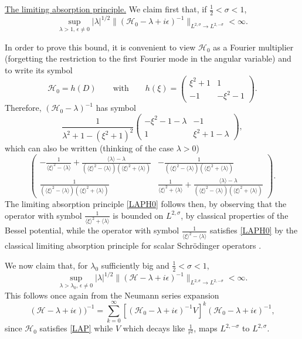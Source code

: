 \documentclass[11 pt]{amsart}
\theoremstyle{definition}
\theoremstyle{remark}
\numberwithin{equation}{section}
\begin{document}
\medskip
\noindent
\underline{The limiting absorption principle.} We claim first that, if $\frac 12 < \sigma <1$,
\begin{equation}
    \label{LAPH0}
\sup_{\lambda>1,\,\epsilon \neq 0} |\lambda|^{1/2} \| (\mathcal{H}_0- \lambda +i\epsilon)^{-1} \|_{L^{2,\sigma} \to L^{2,-\sigma}} < \infty.
\end{equation}

In order to prove this bound, it is convenient to view $\mathcal{H}_0$ as a Fourier multiplier (forgetting the restriction to the first Fourier mode in the angular variable) and to write its symbol  
$$
\mathcal{H}_0 = h(D) \qquad \mbox{with} \qquad 
h(\xi) = \begin{pmatrix} \xi^2 + 1 & 1 \\ -1 & -\xi^2 -1 \end{pmatrix}.
$$
Therefore, $(\mathcal{H}_0 - \lambda)^{-1}$ has symbol
$$
\frac{1}{\lambda^2 + 1 - (\xi^2 + 1)^2} 
\begin{pmatrix} -\xi^2 - 1 - \lambda & - 1 \\ 1 & \xi^2 +1 - \lambda \end{pmatrix},
$$
which can also be written (thinking of the case $\lambda>0$)
$$
\begin{pmatrix}
- \frac{1}{\langle \xi \rangle^2 - \langle \lambda \rangle}
+ \frac{\langle \lambda \rangle - \lambda}{(\langle \xi \rangle^2 - \langle \lambda \rangle)(\langle \xi \rangle^2 + \langle \lambda \rangle)} & - \frac{1}{(\langle \xi \rangle^2 - \langle \lambda \rangle)(\langle \xi \rangle^2 + \langle \lambda \rangle)} \\
\frac{1}{(\langle \xi \rangle^2 - \langle \lambda \rangle)(\langle \xi \rangle^2 + \langle \lambda \rangle)} &
\frac{1}{\langle \xi \rangle^2 + \langle \lambda \rangle}
+ \frac{\langle \lambda \rangle - \lambda}{(\langle \xi \rangle^2 - \langle \lambda \rangle)(\langle \xi \rangle^2 + \langle \lambda \rangle)}
\end{pmatrix}.
$$
The limiting absorption principle \eqref{LAPH0} follows then, by observing that the operator with symbol $\frac{1}{\langle \xi \rangle^2 + \langle \lambda \rangle}$ is bounded on $L^{2,\sigma}$, by classical properties of the Bessel potential, while the operator with symbol $\frac{1}{\langle \xi \rangle^2 - \langle \lambda \rangle}$ satisfies \eqref{LAPH0} by the classical limiting absorption principle for scalar Schr\"odinger operators  \cite{RodnianskiTao}.

We now claim that, for $\lambda_0$ sufficiently big and $\frac 12 < \sigma <1$,
\begin{equation}
    \label{LAP}
\sup_{\lambda>\lambda_0,\,\epsilon \neq 0} |\lambda|^{1/2} \| (\mathcal{H}- \lambda +i\epsilon)^{-1} \|_{L^{2,\sigma} \to L^{2,-\sigma}} < \infty.
\end{equation}
This follows once again from the Neumann series expansion 
$$
(\mathcal{H} - \lambda + i \epsilon ))^{-1} 
= \sum_{k=0}^\infty \left[ (\mathcal{H}_0 - \lambda + i \epsilon )^{-1}  V \right]^k (\mathcal{H}_0 - \lambda + i \epsilon )^{-1},
$$
since $\mathcal{H}_0$ satisfies \eqref{LAP} while $V$ which decays like $\frac{1}{r^2}$, maps $L^{2,-\sigma}$ to $L^{2,\sigma}$.
\end{document}
